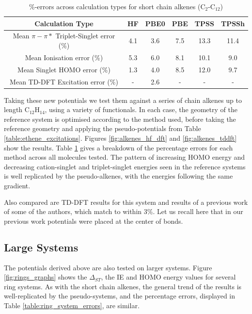 \documentclass[journal=jctcce,manuscript=article]{achemso}
\begin{document}
\begin{table}[h]
\caption{\%-errors across calculation types for short chain alkenes  (C\(_{2}\)-C\(_{12}\))}
\begin{tabular}{c c c c c c }
\hline
Calculation Type & HF & PBE0 & PBE & TPSS & TPSSh \\
\hline
Mean \(\pi - \pi*\) Triplet-Singlet error (\%) & 4.1 & 3.6 & 7.5 & 13.3 & 11.4 \\
Mean Ionisation error (\%) & 5.3 & 6.0 & 8.1 & 10.1 & 9.0 \\
Mean Singlet HOMO error (\%) & 1.3 & 4.0 & 8.5 & 12.0 & 9.7 \\
Mean TD-DFT Excitation error (\%) & - & 2.6 & - & - & - \\ 
\hline
\end{tabular}
\label{table:alkene_errors}
\end{table}

Taking these new potentials we test them against a series of chain alkenes up to length C\(_{12}\)H\(_{14}\), using a variety of functionals. In each case, the geometry of the reference system is optimised according to the method used, 
before taking the reference geometry and applying the pseudo-potentials from Table \ref{table:ethene_excitations}. 
Figures \ref{fig:alkenes_hf_dft} and \ref{fig:alkenes_tddft} show the results. Table \ref{table:alkene_errors} gives a breakdown of the percentage errors for each method across all molecules tested. The pattern of increasing HOMO energy and decreasing cation-singlet and triplet-singlet energies seen in the reference systems is well replicated by the pseudo-alkenes, with the energies following the same gradient.

Also compared are TD-DFT results for this system and results of a previous work of some of the authors, which match to within 3\%.\cite{drujon_pseudopotentials_2013}
Let us recall here that in our previous work potentials were placed at the center of bonds.

\subsection{Large Systems}

The potentials derived above are also tested on larger systems.
Figure \ref{fig:rings_graphs} shows the $\Delta_{ST}$, the IE and
HOMO energy values for several ring systems.
As with the short chain alkenes, the general trend of the results is well-replicated
by the pseudo-systems, and the percentage errors, displayed in Table
\ref{table:ring_system_errors}, are similar.
\end{document}
